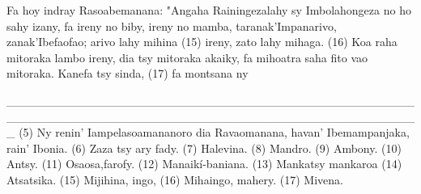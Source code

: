 Fa hoy indray Rasoabemanana: "Angaha Rainingezalahy sy Imbolahongeza no ho sahy izany,
fa ireny no biby, ireny no mamba, taranak'Impanarivo, zanak'Ibefaofao; arivo lahy mihina (15) ireny,
zato lahy mihaga. (16) Koa raha mitoraka lambo ireny, dia tsy mitoraka akaiky, fa
mihoatra saha fito vao mitoraka. Kanefa tsy sinda, (17) fa montsana ny

_________________________________________________________________________________________________
(5) Ny renin' Iampelasoamananoro dia Ravaomanana, havan' Ibemampanjaka, rain' Ibonia.
(6) Zaza tsy ary fady. 
(7) Halevina. 
(8) Mandro. 
(9) Ambony. 
(10) Antsy. 
(11) Osaosa,farofy. 
(12) Manaikí-baniana. 
(13) Mankatsy mankaroa 
(14) Atsatsika. 
(15) Mijihina, ingo,
(16) Mihaingo, mahery. 
(17) Mivena.